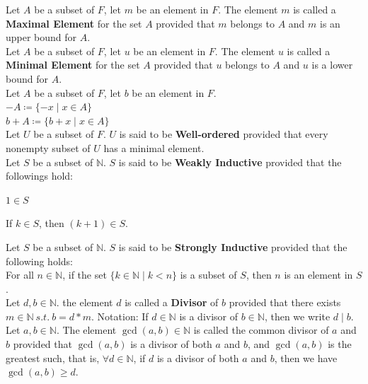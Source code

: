 \documentclass[11pt]{article}
\newcommand{\N}{\mathbb{N}}
\newcommand{\notation}{\color{gray}Notation: \color{black}}
\begin{document}
		\noindent Let $A$ be a subset of $F$, let $m$ be an element in $F$. The element $m$ is called a \textbf{Maximal Element} for the set $A$ provided that $m$ belongs to $A$ and $m$ is an upper bound for $A$.\\
		
		\noindent Let $A$ be a subset of $F$, let $u$ be an element in $F$. The element $u$ is called a \textbf{Minimal Element} for the set $A$ provided that $u$ belongs to $A$ and $u$ is a lower bound for $A$.\\

		\noindent Let $A$ be a subset of $F$, let $b$ be an element in $F$.\\
		$-A \coloneqq \{-x \mid x \in A\} $\\
		$b+A \coloneqq \{b+x \mid x \in A\} $\\
		
		\noindent Let $U$ be a subset of $F$. $U$ is said to be \textbf{Well-ordered} provided that every nonempty subset of $U$ has a minimal element.\\
		
		\noindent Let $S$ be a subset of $\N$. $S$ is said to be \textbf{Weakly Inductive} provided that the followings hold:\\
		\begin{inparaitem}
			\item $1 \in S \ \ \ \ \ \ \ \ \ \ \ \ \ \ \ \ \ \ $
			\item If $k \in S$, then $(k+1) \in S$.\\
		\end{inparaitem}
		
		\noindent Let $S$ be a subset of $\N$. $S$ is said to be \textbf{Strongly Inductive} provided that the following holds:\\
		For all $n \in \N$, if the set $\{k \in \N \mid k< n \}$ is a subset of $S$, then $n$ is an element in $S$.\\
		
		\noindent Let $d,b \in \N$. the element $d$ is called a \textbf{Divisor} of $b$ provided that there exists $ m \in \N \ s.t. \ b=d \ast m$. 
		\notation If $d \in \N$ is a divisor of $b \in \N$, then we write $d\mid b$.\\
		
		\noindent Let $a,b \in \N$. The element $\gcd(a,b) \in \N$ is called the common divisor of $a$ and $b$ provided that $\gcd(a,b)$ is a divisor of both $a$ and $b$, and $\gcd(a,b)$ is the greatest such, that is, $\forall d \in \N$, if $d$ is a divisor of both $a$ and $b$, then we have $\gcd(a,b) \geq d$.\\
		
\end{document}
